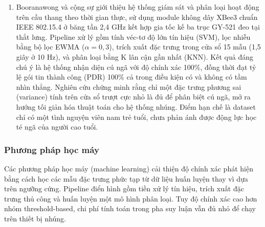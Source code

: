 \documentclass[../DoAn.tex]{subfiles}
\begin{document}
\begin{enumerate}[label=\arabic*)]
\item Booranawong và cộng sự \cite{booranawong2025stairs} giới thiệu hệ thống giám sát và phân loại hoạt động trên cầu thang theo thời gian thực, sử dụng module không dây XBee3 chuẩn IEEE 802.15.4 ở băng tần 2,4 GHz kết hợp gia tốc kế ba trục GY-521 đeo tại thắt lưng. Pipeline xử lý gồm tính véc-tơ độ lớn tín hiệu (SVM), lọc nhiễu bằng bộ lọc EWMA ($\alpha = 0{,}3$), trích xuất đặc trưng trong cửa sổ 15 mẫu (1,5 giây ở 10 Hz), và phân loại bằng K lân cận gần nhất (KNN). Kết quả đáng chú ý là hệ thống nhận diện cú ngã với độ chính xác 100\%, đồng thời đạt tỷ lệ gói tin thành công (PDR) 100\% cả trong điều kiện có và không có tầm nhìn thẳng. Nghiên cứu chứng minh rằng chỉ một đặc trưng phương sai (variance) tính trên cửa sổ trượt cực nhỏ là đủ để phân biệt cú ngã, mở ra hướng tối giản hóa thuật toán cho hệ thống nhúng. Điểm hạn chế là dataset chỉ có một tình nguyện viên nam trẻ tuổi, chưa phản ánh được động lực học té ngã của người cao tuổi.

\end{enumerate}

\subsubsection{Phương pháp học máy}
\label{subsubsection:2.1.2.b}

Các phương pháp học máy (machine learning) cải thiện độ chính xác phát hiện bằng cách học các mẫu đặc trưng phức tạp từ dữ liệu huấn luyện thay vì dựa trên ngưỡng cứng. Pipeline điển hình gồm tiền xử lý tín hiệu, trích xuất đặc trưng thủ công và huấn luyện một mô hình phân loại. Tuy độ chính xác cao hơn nhóm threshold-based, chi phí tính toán trong pha suy luận vẫn đủ nhỏ để chạy trên thiết bị nhúng.
\end{document}
